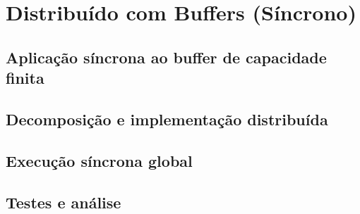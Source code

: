 \section{Distribuído com Buffers (Síncrono)}

\subsection{Aplicação síncrona ao buffer de capacidade finita}

\subsection{Decomposição e implementação distribuída}

\subsection{Execução síncrona global}

\subsection{Testes e análise}


